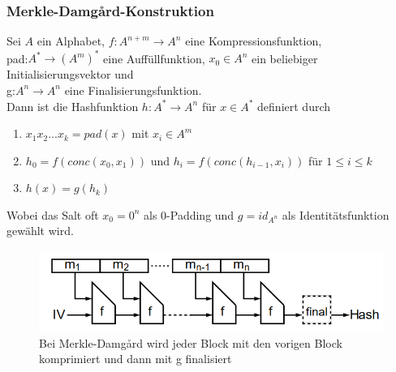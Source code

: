 \documentclass[a4paper,12pt,leqno]{article}
\begin{document}
\subsubsection{Merkle-Damg\r{a}rd-Konstruktion}
Sei $A$ ein Alphabet, $f: A^{n+m}\rightarrow A^n$ eine Kompressionsfunktion,\\
pad:$A^*\rightarrow (A^m)^*$ eine Auffüllfunktion, $x_0\in A^n$ ein beliebiger Initialisierungsvektor und\\
g:$A^n\rightarrow A^n$ eine Finalisierungsfunktion.\\
Dann ist die Hashfunktion $h: A^*\rightarrow A^n$ für $x\in A^*$ definiert durch
\begin{enumerate}
\item $x_1x_2...x_k=pad(x)$ mit $x_i\in A^m$
\item $h_0=f\left( conc(x_0,x_1)\right)$ und $h_i=f\left(conc(h_{i-1},x_i)\right)$ für $1\leq i\leq k$
\item $h(x)=g(h_k)$
\end{enumerate}
Wobei das Salt oft $x_0=0^n$ als 0-Padding und $g=id_{A^n}$ als Identitätsfunktion gewählt wird.
\begin{figure}
\centering
\includegraphics[scale=0.6]{Grafiken/merkledamgard.png}
\caption{Bei Merkle-Damg\r{a}rd wird jeder Block mit den vorigen Block komprimiert und dann mit g finalisiert}
\end{figure}
\end{document}
